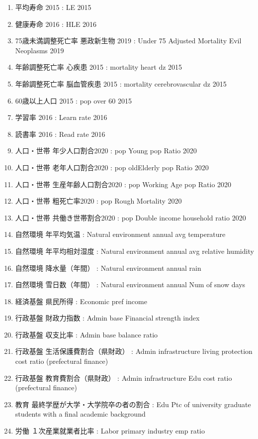 \begin{multicols}{2}
\begin{enumerate}
  \item 平均寿命 2015  :  LE 2015
  \item 健康寿命 2016  :  HLE 2016
  \item 75歳未満調整死亡率 悪政新生物 2019  :  Under 75 Adjusted Mortality Evil Neoplasms 2019
  \item 年齢調整死亡率 心疾患 2015  :  mortality heart dz 2015
  \item 年齢調整死亡率 脳血管疾患 2015  :  mortality cerebrovascular dz 2015
  \item 60歳以上人口 2015  :  pop over 60 2015
  \item 学習率 2016  :  Learn rate 2016
  \item 読書率 2016  :  Read rate 2016
  \item 人口・世帯 年少人口割合2020  :  pop Young pop Ratio 2020
  \item 人口・世帯 老年人口割合2020  :  pop oldElderly pop Ratio 2020
  \item 人口・世帯 生産年齢人口割合2020  :  pop Working Age pop Ratio 2020
  \item 人口・世帯 粗死亡率2020  :  pop Rough Mortality 2020
  \item 人口・世帯 共働き世帯割合2020  :  pop Double income household ratio 2020
  \item 自然環境 年平均気温  :  Natural environment annual avg temperature
  \item 自然環境 年平均相対湿度  :  Natural environment annual avg relative humidity
  \item 自然環境 降水量（年間）  :  Natural environment annual rain
  \item 自然環境 雪日数（年間）  :  Natural environment annual Num of snow days
  \item 経済基盤 県民所得  :  Economic pref income
  \item 行政基盤 財政力指数  :  Admin base Financial strength index
  \item 行政基盤 収支比率  :  Admin base balance ratio
  \item 行政基盤 生活保護費割合（県財政）  :  Admin infrastructure living protection cost ratio (prefectural finance)
  \item 行政基盤 教育費割合（県財政）  :  Admin infrastructure Edu cost ratio (prefectural finance)
  \item 教育 最終学歴が大学・大学院卒の者の割合  :  Edu Ptc of university graduate students with a final academic background
  \item 労働 １次産業就業者比率  :  Labor primary industry emp ratio

\end{enumerate}
\end{multicols}
